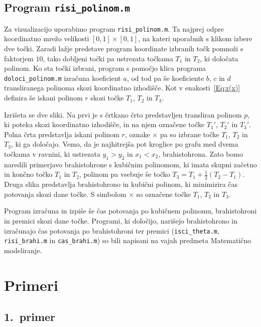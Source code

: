 \documentclass[a4paper]{article}
\begin{document}
\subsection{Program \texttt{risi\_polinom.m}}

Za vizualizacijo uporabimo program \texttt{risi\_polinom.m}.
Ta najprej odpre koordinatno mrežo velikosti $[0,1] \times [0,1]$, na kateri uporabnik s klikom izbere dve točki. Zaradi lažje predstave program koordinate izbranih točk pomnoži s faktorjem $10$, tako dobljeni točki pa ustrezata točkama $T_1$ in $T_2$, ki določata polinom.
Ko sta točki izbrani, program s pomočjo klica programa \texttt{doloci\_polinom.m} izračuna koeficient $a$, od tod pa še koeficiente $b$, $c$ in $d$ transliranega polinoma skozi koordinatno izhodišče. Kot v enakosti~\eqref{Eq:r(x)} definira še iskani polinom $r$ skozi točke $T_1$, $T_2$ in $T_3$.

Izrišeta se dve sliki.
Na prvi je s črtkano črto predstavljen transliran polinom $p$, ki poteka skozi koordinatno izhodišče, in na njem označene točke $T_{1}'$, $T_{2}'$ in $T_{3}'$.
Polna črta predstavlja iskani polinom $r$, oznake $\times$ pa so izbrane točke $T_1$, $T_2$ in $T_3$, ki ga določajo.  
%
Vemo, da je najhitrejša pot kroglice po grafu med dvema točkama v ravnini, ki ustrezata $y_1 > y_2$ in $x_1 < x_2$, brahistohrona. Zato bomo naredili primerjavo brahistohrone s kubičnim polinomom, ki imata skupni začetno in končno točko $T_1$ in $T_2$, polinom pa vsebuje še točko $T_3 = T_1 + \frac{1}{2} (T_2-T_1) $.
Druga slika predstavlja brahistohrono in kubični polinom, ki minimizira čas potovanja skozi dane točke. S simbolom $\times$ so označene točke $T_1$, $T_2$ in $T_3$.

Program izračuna in izpiše še čas potovanja po kubičnem polinomu, brahistohroni in premici skozi dane točke.
Programi, ki določijo, narišejo brahistohrono in izračunajo čas potovanja po brahistohroni ter premici (\texttt{isci\_theta.m}, \texttt{risi\_brahi.m} in \texttt{cas\_brahi.m}) so bili napisani na vajah predmeta Matematično modeliranje. 

\section{Primeri}

\subsection{1.~primer}
\end{document}
